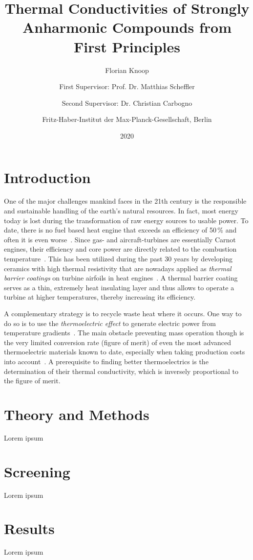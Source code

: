 \documentclass[a4paper,12pt]{book}
\title{
    Thermal Conductivities of Strongly Anharmonic Compounds from First Principles
}
\author{
    Florian Knoop
    \\ \and
    First Supervisor: Prof. Dr. Matthias Scheffler
    \and
    Second Supervisor: Dr. Christian Carbogno
    \\ \and
    Fritz-Haber-Institut der Max-Planck-Gesellschaft, Berlin
}
\date{2020}
\begin{document}
\maketitle

\chapter{Introduction}
One of the major challenges mankind faces in the 21th century is the responsible and sustainable handling of the earth's natural resources.  In fact, most energy 
today is lost during the transformation of raw energy sources to usable 
power. To date, there is no fuel based heat engine that exceeds an 
efficiency of 50\,\% and often it is even worse~\cite{eia}. 
Since gas- and aircraft-turbines
are essentially Carnot engines, their efficiency and core power are directly related to the 
combustion temperature~\cite{Clarke2012,Perepezko2009}.
This has been utilized during the past 30 years by developing 
ceramics with high thermal resistivity that are nowadays applied as 
\emph{thermal barrier coatings} on turbine airfoils in heat engines~\cite{Clarke2003}. 
A thermal barrier coating serves as a thin, extremely heat insulating layer and thus allows to 
operate a turbine at
higher temperatures, thereby increasing its efficiency.

A complementary strategy %
is to recycle waste heat where it occurs.
One way to do so is to use the
\emph{thermoelectric effect} to 
generate electric power from temperature gradients~\cite{Tritt2}. The main obstacle 
preventing mass operation though is the very limited conversion rate (figure of merit) of even the 
most 
advanced thermoelectric materials known to date, especially when taking production costs 
into account~\cite{Nolas2001}. A prerequisite to finding better thermoelectrics is the 
determination of their thermal conductivity, which is inversely proportional to the figure of merit.

\chapter{Theory and Methods}
Lorem ipsum

\chapter{Screening}
Lorem ipsum

\chapter{Results}
Lorem ipsum
\end{document}
